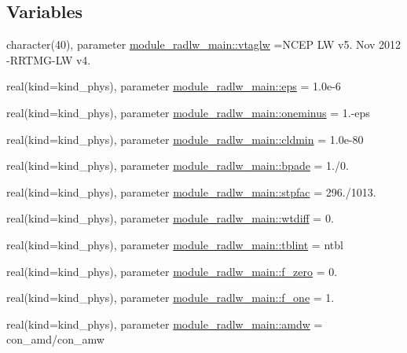 \subsection*{Variables}
\begin{DoxyCompactItemize}
\item 
character(40), parameter \hyperlink{namespacemodule__radlw__main_a8d63a28d2550f8e193619e46a4c47d70}{module\+\_\+radlw\+\_\+main\+::vtaglw} =\textquotesingle{}N\+C\+EP LW v5. Nov 2012 -\/R\+R\+T\+MG-\/LW v4. \textquotesingle{}
\item 
real(kind=kind\+\_\+phys), parameter \hyperlink{group__module__radlw__main_gac82309fd8d0e351ac37b276833a10376}{module\+\_\+radlw\+\_\+main\+::eps} = 1.\+0e-\/6
\item 
real(kind=kind\+\_\+phys), parameter \hyperlink{group__module__radlw__main_ga8c35a92c2a08663ce04bdf9de8717247}{module\+\_\+radlw\+\_\+main\+::oneminus} = 1.-\/eps
\item 
real(kind=kind\+\_\+phys), parameter \hyperlink{group__module__radlw__main_gac55ad4a1ff397794e054be6647bafb73}{module\+\_\+radlw\+\_\+main\+::cldmin} = 1.\+0e-\/80
\item 
real(kind=kind\+\_\+phys), parameter \hyperlink{group__module__radlw__main_ga5c63b9836ad5735dd3d0811ff527c41c}{module\+\_\+radlw\+\_\+main\+::bpade} = 1./0.
\item 
real(kind=kind\+\_\+phys), parameter \hyperlink{group__module__radlw__main_ga483b88df2bdada7ef349d9530f91b762}{module\+\_\+radlw\+\_\+main\+::stpfac} = 296./1013.
\item 
real(kind=kind\+\_\+phys), parameter \hyperlink{group__module__radlw__main_gaf1a0ca36bfce779493a7d1a4b81f6f73}{module\+\_\+radlw\+\_\+main\+::wtdiff} = 0.
\item 
real(kind=kind\+\_\+phys), parameter \hyperlink{group__module__radlw__main_gaf6b84954042db7b1e2a6abdb4d401ccf}{module\+\_\+radlw\+\_\+main\+::tblint} = ntbl
\item 
real(kind=kind\+\_\+phys), parameter \hyperlink{group__module__radlw__main_ga9b8f65236249b31c8f9fcf1cfd0e7baa}{module\+\_\+radlw\+\_\+main\+::f\+\_\+zero} = 0.
\item 
real(kind=kind\+\_\+phys), parameter \hyperlink{group__module__radlw__main_ga518605a1451822f1888c6c7e85e07328}{module\+\_\+radlw\+\_\+main\+::f\+\_\+one} = 1.
\item 
real(kind=kind\+\_\+phys), parameter \hyperlink{group__module__radlw__main_ga9845c3a6eaa014e6a310fe1436162e37}{module\+\_\+radlw\+\_\+main\+::amdw} = con\+\_\+amd/con\+\_\+amw

\end{DoxyCompactItemize}
